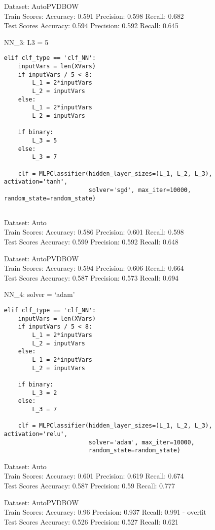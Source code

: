 \documentclass[11pt,preprint, authoryear]{elsarticle}
\numberwithin{equation}{section}
\numberwithin{figure}{section}
\numberwithin{table}{section}
\begin{document}
Dataset: AutoPVDBOW\\
Train Scores: Accuracy: 0.591 Precision: 0.598 Recall: 0.682\\
Test Scores Accuracy: 0.594 Precision: 0.592 Recall: 0.645

NN\_3: L3 = 5

\begin{verbatim}
elif clf_type == 'clf_NN':
    inputVars = len(XVars)
    if inputVars / 5 < 8:
        L_1 = 2*inputVars
        L_2 = inputVars
    else:
        L_1 = 2*inputVars
        L_2 = inputVars

    if binary:
        L_3 = 5
    else:
        L_3 = 7

    clf = MLPClassifier(hidden_layer_sizes=(L_1, L_2, L_3), activation='tanh', 
                        solver='sgd', max_iter=10000, random_state=random_state)
                         
\end{verbatim}

Dataset: Auto\\
Train Scores: Accuracy: 0.586 Precision: 0.601 Recall: 0.598\\
Test Scores Accuracy: 0.599 Precision: 0.592 Recall: 0.648

Dataset: AutoPVDBOW\\
Train Scores: Accuracy: 0.594 Precision: 0.606 Recall: 0.664\\
Test Scores Accuracy: 0.587 Precision: 0.573 Recall: 0.694

NN\_4: solver = `adam'

\begin{verbatim}
elif clf_type == 'clf_NN':  
    inputVars = len(XVars)  
    if inputVars / 5 < 8:  
        L_1 = 2*inputVars  
        L_2 = inputVars  
    else:  
        L_1 = 2*inputVars  
        L_2 = inputVars  

    if binary:  
        L_3 = 2  
    else:  
        L_3 = 7  

    clf = MLPClassifier(hidden_layer_sizes=(L_1, L_2, L_3), activation='relu', 
                        solver='adam', max_iter=10000,
                        random_state=random_state)
\end{verbatim}

Dataset: Auto\\
Train Scores: Accuracy: 0.601 Precision: 0.619 Recall: 0.674\\
Test Scores Accuracy: 0.587 Precision: 0.59 Recall: 0.777

Dataset: AutoPVDBOW\\
Train Scores: Accuracy: 0.96 Precision: 0.937 Recall: 0.991 - overfit\\
Test Scores Accuracy: 0.526 Precision: 0.527 Recall: 0.621
\end{document}
